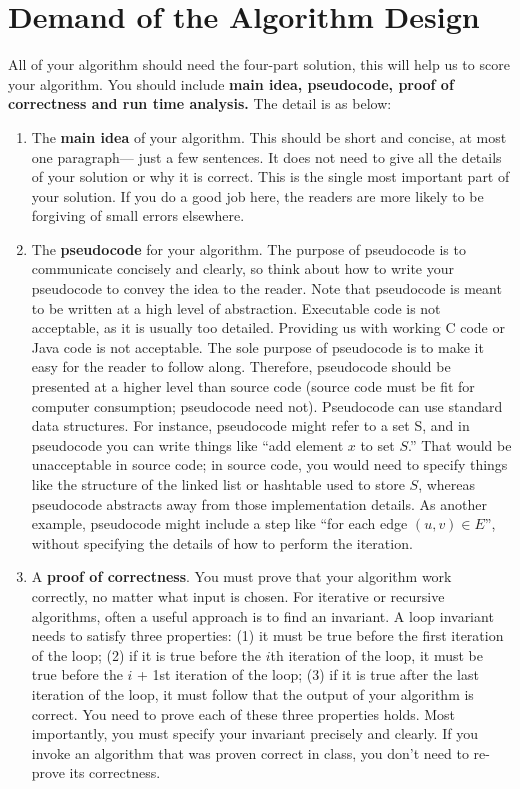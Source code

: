 \documentclass{article}
\begin{document}
\section*{Demand of the Algorithm Design}
All of your algorithm should need the four-part solution, this will help us to score your algorithm. You should include {\large\textbf{main idea, pseudocode, proof of correctness and run time analysis.}} The detail is as below:
\begin{enumerate}

\item The {\textbf{main idea}} of your algorithm. This should be short and concise, at most one paragraph—
just a few sentences. It does not need to give all the details of your solution or why it is
correct. This is the single most important part of your solution. If you do
a good job here, the readers are more likely to be forgiving of small errors elsewhere.

\item The {\textbf{pseudocode}} for your algorithm. The purpose of pseudocode is to communicate concisely and clearly, so think about how to write your pseudocode to convey the idea to the
reader.
Note that pseudocode is meant to be written at a high level of abstraction. Executable code is
not acceptable, as it is usually too detailed. Providing us with working C code or Java code
is not acceptable. The sole purpose of pseudocode is to make it easy for the reader to follow
along. Therefore, pseudocode should be presented at a higher level than source code (source
code must be fit for computer consumption; pseudocode need not). Pseudocode can use
standard data structures. For instance, pseudocode might refer to a set S, and in pseudocode
you can write things like “add element $x$ to set $S$.” That would be unacceptable in source
code; in source code, you would need to specify things like the structure of the linked list
or hashtable used to store $S$, whereas pseudocode abstracts away from those implementation
details. As another example, pseudocode might include a step like “for each edge $(u, v) \in E$”,
without specifying the details of how to perform the iteration. 

\item A {\textbf{proof of correctness}}.  You must prove that your algorithm work correctly, no matter
what input is chosen.
For iterative or recursive algorithms, often a useful approach is to find an invariant. A loop
invariant needs to satisfy three properties: (1) it must be true before the first iteration of the
loop; (2) if it is true before the $i$th iteration of the loop, it must be true before the $i$ + 1st
iteration of the loop; (3) if it is true after the last iteration of the loop, it must follow that the output of your algorithm is correct. You need to prove each of these three properties holds.
Most importantly, you must specify your invariant precisely and clearly.
If you invoke an algorithm that was proven correct in class, you don’t need to re-prove its correctness.


\end{enumerate}
\end{document}
